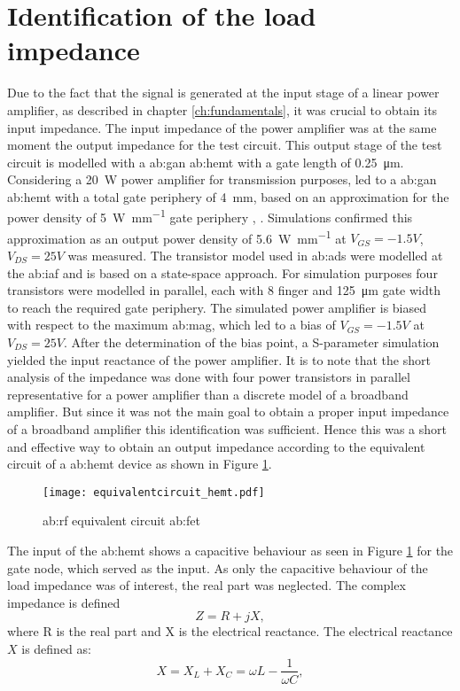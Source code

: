 \section{Identification of the load impedance} %
Due to the fact that the signal is generated at the input stage of a linear power amplifier, as described in chapter \ref{ch:fundamentals}, it was crucial to obtain its input impedance.
The input impedance of the power amplifier was at the same moment the output impedance for the test circuit. 
This output stage of the test circuit is modelled with a \gls{ab:gan} \gls{ab:hemt} with a gate length of \SI{0.25}{\micro \meter}.
Considering a \SI{20}{\watt} power amplifier for transmission purposes, led to a \gls{ab:gan} \gls{ab:hemt} with a total gate periphery of \SI{4}{\milli \metre}, based on an approximation for the power density of \SI[per-mode=fraction]{5}{\watt\per\milli\metre} gate periphery  \cite{Maroldt2010}, \cite{GaNBook}.
Simulations confirmed this approximation as an output power density of \SI[per-mode=fraction]{5.6}{\watt\per\milli\metre} at $V_{GS} = -1.5 V$, $V_{DS} = 25 V$ was measured.
The transistor model used in \gls{ab:ads} were modelled at the \gls{ab:iaf}\cite{model} and is based on a state-space approach. 
For simulation purposes four transistors were modelled in parallel, each with 8 finger and \SI{125}{\micro \metre} gate width to reach the required gate periphery.
The simulated power amplifier is biased with respect to the maximum \gls{ab:mag}, which led to a bias of $V_{GS} = -1.5 V$ at $V_{DS} = 25 V$.
After the determination of the bias point, a S-parameter simulation yielded the input reactance of the power amplifier.
It is to note that the short analysis of the impedance was done with four power transistors in parallel representative for a power amplifier than a discrete model of a broadband amplifier.
But since it was not the main goal to obtain a proper input impedance of a broadband amplifier this identification was sufficient.
Hence this was a short and effective way to obtain an output impedance according to the equivalent circuit of a \gls{ab:hemt} device as shown in Figure \ref{fig:eqcircuit}.

\begin{figure}[H] %
	\centering
  \texttt{[image: equivalentcircuit\_hemt.pdf]}
	\caption{\gls{ab:rf} equivalent circuit \gls{ab:fet} \cite{Quay2014}}
	\label{fig:eqcircuit}
\end{figure}

The input of the \gls{ab:hemt} shows a capacitive behaviour as seen in Figure \ref{fig:eqcircuit} for the gate node, which served as the input.
As only the capacitive behaviour of the load impedance was of interest, the real part was neglected.
The complex impedance is defined
\begin{equation}
	Z = R + jX,
\label{eq:reactance}
\end{equation}
where R is the real part and X is the electrical reactance.
The electrical reactance $X$ is defined as:
\begin{equation}
	X = X_{L} + X_{C} = \omega L -\frac{1}{\omega C},
\label{eq:reactance}
\end{equation}

